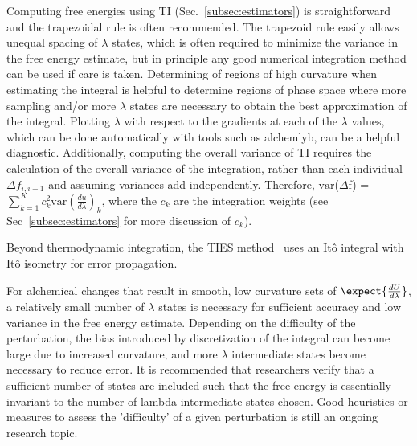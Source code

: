 Computing free energies using TI (Sec.~\ref{subsec:estimators}) is straightforward and the trapezoidal rule is often recommended. The trapezoid rule easily allows unequal spacing of $\lambda$ states, which is often required to minimize the variance in the free energy estimate, but in principle any good numerical integration method can be used if care is taken.  
Determining of regions of high curvature when estimating the integral is helpful to determine regions of phase space where more sampling and/or more $\lambda$ states are necessary to obtain the best approximation of the integral. Plotting $\lambda$ with respect to the gradients at each of the $\lambda$ values, which can be done automatically with tools such as alchemlyb,  can be a helpful diagnostic. 
Additionally, computing the overall variance of TI requires the calculation of the overall variance of the integration, rather than each individual $\Delta f_{i,i+1}$ and assuming variances add independently.
Therefore, $\mathrm{var}$($\Delta$f) = $\sum_{k=1}^{K}c_{k}^2 \mathrm{var}(\frac{du}{d\lambda})_{k}$, where the $c_k$ are the integration weights (see Sec~\ref{subsec:estimators} for more discussion of $c_k$).


Beyond thermodynamic integration, the TIES method~\cite{bhati2017} uses an It\^{o} integral with It\^{o} isometry for error propagation.

For alchemical changes that result in smooth, low curvature sets of $\expect{\frac{dU}{d\lambda}}$, a relatively small number of $\lambda$ states is necessary for sufficient accuracy and low variance in the free energy estimate. 
Depending on the difficulty of the perturbation, the bias introduced by discretization of the integral can become large due to increased curvature, and more $\lambda$ intermediate states become necessary to reduce error.
It is recommended that researchers verify that a sufficient number of states are included such that the free energy is essentially invariant to the number of lambda intermediate states chosen. Good heuristics or measures to assess the 'difficulty' of a given perturbation is still an ongoing research topic. 

